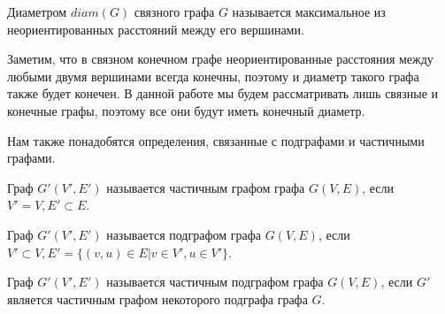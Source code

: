 \begin{defn}
	Диаметром $diam(G)$ связного графа $G$ называется максимальное из неориентированных расстояний между его вершинами.
\end{defn}

Заметим, что в связном конечном графе неориентированные расстояния между любыми двумя вершинами всегда конечны, поэтому и диаметр такого графа также будет конечен. В данной работе мы будем рассматривать лишь связные и конечные графы, поэтому все они будут иметь конечный диаметр.

Нам также понадобятся определения, связанные с подграфами и частичными графами.

\begin{defn}
	 Граф $G'(V', E')$ называется частичным графом графа $G(V, E)$, если $V' = V, E' \subset E$.
\end{defn}

\begin{defn}
	Граф $G'(V', E')$ называется подграфом графа $G(V, E)$, если $V' \subset V, E' = \{(v, u) \in E | v \in V', u \in V'\}$.
\end{defn}

\begin{defn}
	Граф $G'(V', E')$ называется частичным подграфом графа $G(V, E)$, если $G'$ является частичным графом некоторого подграфа графа $G$.
\end{defn}
